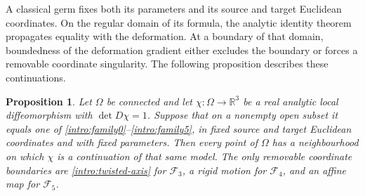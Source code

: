 \documentclass[11pt,a4paper]{article}
\numberwithin{equation}{section}
\theoremstyle{plain}
\newtheorem{proposition}[theorem]{Proposition}
\theoremstyle{definition}
\theoremstyle{remark}
\begin{document}
A classical germ fixes both its parameters and its source and target
Euclidean coordinates. On the regular domain of its formula, the
analytic identity theorem propagates equality with the
deformation. At a boundary of that domain, boundedness of the
deformation gradient either excludes the boundary or forces a removable
coordinate singularity. The following proposition describes these continuations.

\begin{proposition}\label{completion:continuation}
Let $\Omega$ be connected and let $\chi:\Omega\to\mathbb R^3$ be a real
analytic local diffeomorphism with $\det D\chi=1$. Suppose that on a
nonempty open subset it equals one of
\eqref{intro:family0}--\eqref{intro:family5}, in fixed source and target
Euclidean coordinates and with fixed parameters. Then every point of
$\Omega$ has a neighbourhood on which $\chi$ is a continuation of that
same model. The only removable coordinate boundaries are
\eqref{intro:twisted-axis} for $\mathcal F_3$, a rigid motion for
$\mathcal F_4$, and an affine map for $\mathcal F_5$.
\end{proposition}
\end{document}
